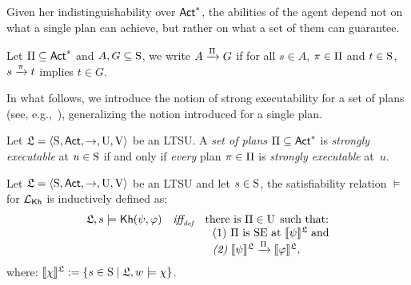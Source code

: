     
    Given her indistinguishability over $\Act^*$, the abilities of the agent depend not on what a single plan can achieve, but rather on what a set of them can guarantee.
    
    \medskip
    
    \begin{definition}
       Let $\plans \subseteq \Act^*$ and $A,G \subseteq \S$, we write $A\reach{\plans} G$ if for all $s\in A$, $\plan\in\plans$ and $t\in \S$,  $s \reach{\plan} t$ implies $t\in G$. 
    \end{definition}
    
    \medskip
    
    In what follows, we introduce the notion of strong executability for a set of plans (see, e.g.,~\cite{AFSVQ23}), generalizing the notion introduced for a single plan.
    
    \medskip
    
    
    \begin{definition}\label{def:plans-exec}
    Let $\model=\tup{\S,\Act,\ra,\Unc,\V}$ be an LTSU. A \emph{set of plans} $\plans \subseteq \Act^*$ is \emph{strongly executable} at $u \in \S$ if and only if \emph{every} plan $\plan \in \plans$ is \emph{strongly executable} at~$u$.
    \end{definition}

    \begin{definition} \label{def:semantics-kh-uncertain}
        Let $\model = \tup{\S,\Act,\ra,\Unc,\V}$ be an LTSU and let $s\in\S$, the satisfiability relation $\models$ for $\Khlogic$ is inductively defined as:
        \[
        \begin{array}{l@{\ \ \ }c@{\ \ \  }l}
        \model, s \models \kh(\psi,\varphi) & \iffdef & \text{there is } \plans \in \Unc \;\text{such that:} \\
        & & \ \ \text{\rm (1)} \ \plans \text{ is SE at }  \truthset{\model}{\psi}\; \text{and} \\
        & & \ \ \text{\em (2)} \ \truthset{\model}{\psi} \reach{\plans} \truthset{\model}{\varphi}, 
        \end{array}
        \]      where: $\truthset{\model}{\chi} := \csetsc{s\in\S}{\model,w\models\chi}$. 
    \end{definition}
    
